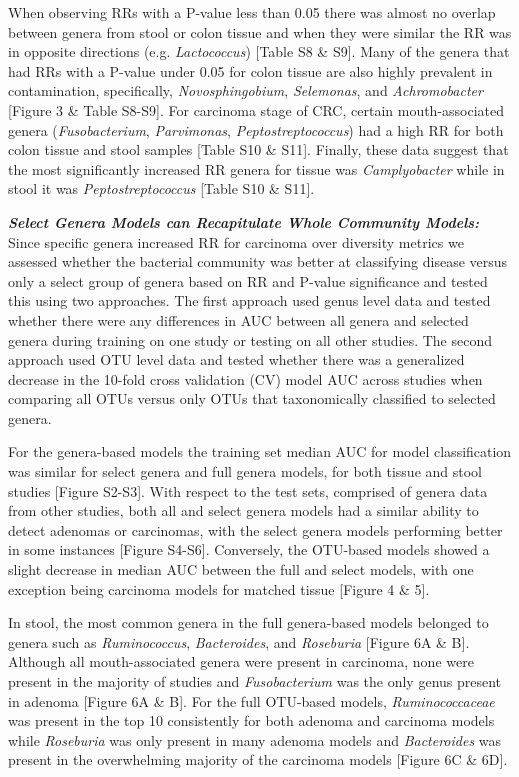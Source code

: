 \documentclass[12pt,]{article}
\begin{document}
When observing RRs with a P-value less than 0.05 there was almost no
overlap between genera from stool or colon tissue and when they were
similar the RR was in opposite directions (e.g. \emph{Lactococcus})
{[}Table S8 \& S9{]}. Many of the genera that had RRs with a P-value
under 0.05 for colon tissue are also highly prevalent in contamination,
specifically, \emph{Novosphingobium}, \emph{Selemonas}, and
\emph{Achromobacter} {[}Figure 3 \& Table S8-S9{]}. For carcinoma stage
of CRC, certain mouth-associated genera (\emph{Fusobacterium},
\emph{Parvimonas}, \emph{Peptostreptococcus}) had a high RR for both
colon tissue and stool samples {[}Table S10 \& S11{]}. Finally, these
data suggest that the most significantly increased RR genera for tissue
was \emph{Camplyobacter} while in stool it was \emph{Peptostreptococcus}
{[}Table S10 \& S11{]}.

\textbf{\emph{Select Genera Models can Recapitulate Whole Community
Models:}} Since specific genera increased RR for carcinoma over
diversity metrics we assessed whether the bacterial community was better
at classifying disease versus only a select group of genera based on RR
and P-value significance and tested this using two approaches. The first
approach used genus level data and tested whether there were any
differences in AUC between all genera and selected genera during
training on one study or testing on all other studies. The second
approach used OTU level data and tested whether there was a generalized
decrease in the 10-fold cross validation (CV) model AUC across studies
when comparing all OTUs versus only OTUs that taxonomically classified
to selected genera.

For the genera-based models the training set median AUC for model
classification was similar for select genera and full genera models, for
both tissue and stool studies {[}Figure S2-S3{]}. With respect to the
test sets, comprised of genera data from other studies, both all and
select genera models had a similar ability to detect adenomas or
carcinomas, with the select genera models performing better in some
instances {[}Figure S4-S6{]}. Conversely, the OTU-based models showed a
slight decrease in median AUC between the full and select models, with
one exception being carcinoma models for matched tissue {[}Figure 4 \&
5{]}.

In stool, the most common genera in the full genera-based models
belonged to genera such as \emph{Ruminococcus}, \emph{Bacteroides}, and
\emph{Roseburia} {[}Figure 6A \& B{]}. Although all mouth-associated
genera were present in carcinoma, none were present in the majority of
studies and \emph{Fusobacterium} was the only genus present in adenoma
{[}Figure 6A \& B{]}. For the full OTU-based models,
\emph{Ruminococcaceae} was present in the top 10 consistently for both
adenoma and carcinoma models while \emph{Roseburia} was only present in
many adenoma models and \emph{Bacteroides} was present in the
overwhelming majority of the carcinoma models {[}Figure 6C \& 6D{]}.
\end{document}
